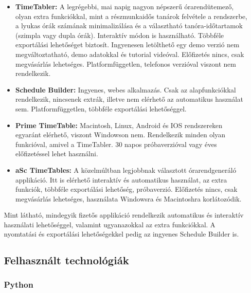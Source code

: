 \documentclass[a4paper,12pt]{article}
\begin{document}
\begin{itemize}
    \item \textbf{TimeTabler:} A legrégebbi, mai napig nagyon népszerű órarendütemező, olyan extra funkciókkal,
             mint a részmunkaidős tanárok felvétele a rendszerbe, a lyukas órák számának minimalizálása és a választható
             tanóra-időtartamok (szimpla vagy dupla órák). Interaktív módon is használható. Többféle exportálási lehetőséget biztosít.
             Ingyenesen letölthető egy demo verzió nem megváltoztatható, demo adatokkal és 
             tutorial videóval. Előfizetés nincs, csak megvásárlás lehetséges. 
             Platformfüggetlen, telefonos verzióval viszont nem rendelkezik.
    \item \textbf{Schedule Builder:} Ingyenes, webes alkalmazás. Csak az alapfunkciókkal rendelkezik,
                   nincsenek extrák, illetve nem elérhető az automatikus használat sem.
                   Platformfüggetlen, többféle exportálási lehetőséggel.
    \item \textbf{Prime TimeTable:} Macintosh, Linux, Android és IOS rendszereken egyaránt elérhető, viszont
                  Windowson nem. Rendelkezik minden olyan funkcióval, amivel a TimeTabler. 30 napos próbaverzióval vagy éves
                  előfizetéssel lehet használni.
    \item \textbf{aSc TimeTables:} A közelmúltban legjobbnak választott órarendgeneráló applikáció. Itt is elérhető interaktív és
                 automatikus használat, az extra funkciók, többféle exportálási lehetőség, próbaverzió. Előfizetés nincs, csak
                 megvásárlás lehetséges, használata Windowsra és Macintoshra korlátozódik.
\end{itemize}

Mint látható, mindegyik fizetős applikáció rendelkezik automatikus és interaktív használati
lehetőséggel, valamint ugyanazokkal az extra funkciókkal. A nyomtatási és exportálási lehetőségekkel
pedig az ingyenes Schedule Builder is. 

\subsection{Felhasznált technológiák}

\subsubsection{Python}
\end{document}
